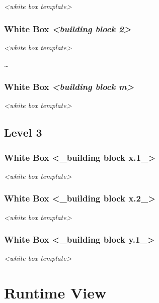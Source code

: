 \documentclass[]{article}
\begin{document}
\emph{\textless{}white box template\textgreater{}}

\subsubsection{\texorpdfstring{White Box \emph{\textless{}building block
2\textgreater{}}}{White Box \textless{}building block 2\textgreater{}}}\label{_white_box_emphasis_building_block_2_emphasis}

\emph{\textless{}white box template\textgreater{}}

\ldots{}

\subsubsection{\texorpdfstring{White Box \emph{\textless{}building block
m\textgreater{}}}{White Box \textless{}building block m\textgreater{}}}\label{_white_box_emphasis_building_block_m_emphasis}

\emph{\textless{}white box template\textgreater{}}

\subsection{Level 3}\label{_level_3}

\subsubsection{White Box \textless{}\_building block
x.1\_\textgreater{}}\label{_white_box_building_block_x_1}

\emph{\textless{}white box template\textgreater{}}

\subsubsection{White Box \textless{}\_building block
x.2\_\textgreater{}}\label{_white_box_building_block_x_2}

\emph{\textless{}white box template\textgreater{}}

\subsubsection{White Box \textless{}\_building block
y.1\_\textgreater{}}\label{_white_box_building_block_y_1}

\emph{\textless{}white box template\textgreater{}}

\section{Runtime View}\label{section-runtime-view}
\end{document}
